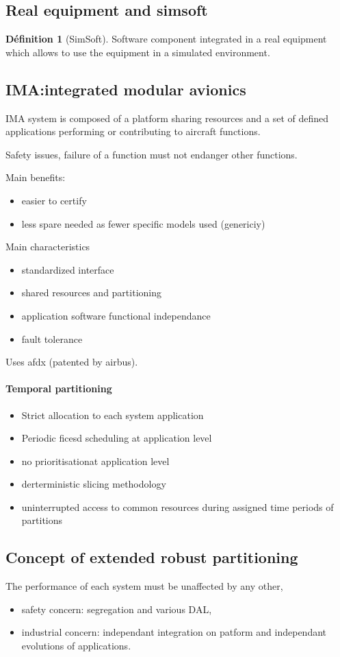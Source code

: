 \documentclass[10pt]{article}
\theoremstyle{plain}
\theoremstyle{definition}
\newtheorem{defn}{Définition}
\theoremstyle{remark}
\begin{document}
\subsection{Real equipment and simsoft}
\begin{defn}
	[SimSoft]
	Software component integrated in a real equipment which allows to use the
	equipment in a simulated environment.
\end{defn}

\subsection{IMA:\@ integrated modular avionics}
IMA system is composed of a platform sharing resources and a set of defined
applications performing or contributing to aircraft functions.

Safety issues, failure of a function must not endanger other functions.

Main benefits:
\begin{itemize}
	\item easier to certify
	\item less spare needed as fewer specific models used (genericiy)
\end{itemize}

Main characteristics
\begin{itemize}
	\item standardized interface
	\item shared resources and partitioning
	\item application software functional independance
	\item fault tolerance
\end{itemize}

Uses afdx (patented by airbus).

\paragraph{Temporal partitioning}\label{par:temporal_partitioning}

\begin{itemize}
	\item Strict allocation to each system application
	\item Periodic ficesd scheduling at application level
	\item no prioritisationat application level
	\item derterministic slicing methodology
	\item uninterrupted access to common resources during assigned time periods
		of partitions
\end{itemize}

\subsection{Concept of extended robust partitioning}
The performance of each system must be unaffected by any other,
\begin{itemize}
	\item safety concern: segregation and various DAL,
	\item industrial concern: independant integration on patform and independant
		evolutions of applications.
\end{itemize}
\end{document}
